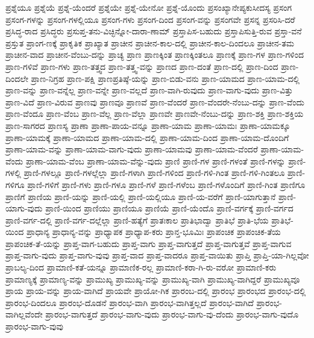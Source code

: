 {ಪ್ರಶ್ನೆಯೂ
ಪ್ರಶ್ನೆಯೆ
ಪ್ರಶ್ನೆ-ಯೆಂದರೆ
ಪ್ರಶ್ನೆಯೇ
ಪ್ರಶ್ನೆ-ಯೇನೋ
ಪ್ರಶ್ನೆ-ಯೊಂದು
ಪ್ರಸಂಖ್ಯಾನೇಪ್ಯಕುಸೀದಸ್ಯ
ಪ್ರಸಂಗ
ಪ್ರಸಂಗ-ಗಳನ್ನು
ಪ್ರಸಂಗ-ಗಳಲ್ಲಿಯೂ
ಪ್ರಸಂಗ-ಗಳು
ಪ್ರಸಂಗ-ದಿಂದ
ಪ್ರಸಂಗ-ವನ್ನು
ಪ್ರಸಂಗವೇ
ಪ್ರಸನ್ನ
ಪ್ರಸರಿಸಿ-ದರೆ
ಪ್ರಸಿದ್ಧ-ರಾದ
ಪ್ರಸಿದ್ಧರು
ಪ್ರಸುಪ್ತ-ತನು-ವಿಚ್ಛಿನ್ನೋ-ದಾರಾ-ಣಾಮ್
ಪ್ರಸ್ತಾಪಿಸ-ಬಹುದು
ಪ್ರಸ್ತಾಪಿಸುತ್ತಿ-ರುವ
ಪ್ರಸ್ತಾ-ವನೆ
ಪ್ರಸ್ತುತ
ಪ್ರಾಂಗ-ಣಕ್ಕೆ
ಪ್ರಾಕೃತಿಕ
ಪ್ರಾಖ್ಯಾತ
ಪ್ರಾಚೀನ
ಪ್ರಾಚೀನ-ಕಾಲ-ದಲ್ಲಿ
ಪ್ರಾಚೀನ-ಕಾಲ-ದಿಂದಲೂ
ಪ್ರಾಚೀನ-ತಮ
ಪ್ರಾಚೀನ-ವಾದ
ಪ್ರಾಚೀನ-ವೆಂಬು-ದನ್ನು
ಪ್ರಾಚ್ಯ
ಪ್ರಾಣ
ಪ್ರಾಣಕ್ಕಿಂತ
ಪ್ರಾಣಕ್ಕಿಂತಲೂ
ಪ್ರಾಣಕ್ಕೆ
ಪ್ರಾಣ-ಗಳ
ಪ್ರಾಣ-ಗಳಿಂದ
ಪ್ರಾಣ-ಗಳಿವೆ
ಪ್ರಾಣ-ಗಳು
ಪ್ರಾಣ-ತತ್ತ್ವದ
ಪ್ರಾಣ-ತತ್ತ್ವ-ವನ್ನು
ಪ್ರಾಣದ
ಪ್ರಾಣ-ದಂತೆ
ಪ್ರಾಣ-ದಲ್ಲಿ
ಪ್ರಾಣ-ದಿಂದ
ಪ್ರಾಣ-ದಿಂದಲೇ
ಪ್ರಾಣ-ನಿಗ್ರಹ
ಪ್ರಾಣ-ಪಕ್ಷಿ
ಪ್ರಾಣಪ್ರತಿಷ್ಠೆ-ಯನ್ನು
ಪ್ರಾಣ-ಬಿಡು-ವನು
ಪ್ರಾಣ-ಯಾಮದ
ಪ್ರಾಣ-ಯಾಮ-ದಲ್ಲಿ
ಪ್ರಾಣ-ವನ್ನು
ಪ್ರಾಣ-ವನ್ನೆಲ್ಲ
ಪ್ರಾಣ-ವನ್ನೇ
ಪ್ರಾಣ-ವಲ್ಲದೆ
ಪ್ರಾಣ-ವಾಗಿ-ರುವುದು
ಪ್ರಾಣ-ವಾಗು-ವುದು
ಪ್ರಾಣ-ವಿತ್ತು
ಪ್ರಾಣ-ವಿದೆ
ಪ್ರಾಣ-ವಿರುವ
ಪ್ರಾಣವು
ಪ್ರಾಣವೂ
ಪ್ರಾಣವೆ
ಪ್ರಾಣ-ವೆಂದರೆ
ಪ್ರಾಣ-ವೆಂದರೇ-ನೆಂಬು-ದನ್ನು
ಪ್ರಾಣ-ವೆಂದು
ಪ್ರಾಣ-ವೆಂದೂ
ಪ್ರಾಣ-ವೆಂಬ
ಪ್ರಾಣ-ವೆಲ್ಲ
ಪ್ರಾಣ-ವೆಲ್ಲಾ
ಪ್ರಾಣವೇ
ಪ್ರಾಣವೇ-ನೆಂಬು-ದನ್ನು
ಪ್ರಾಣ-ಶಕ್ತಿ
ಪ್ರಾಣ-ಶಕ್ತಿಯ
ಪ್ರಾಣ-ಸಾಗರದ
ಪ್ರಾಣಸ್ಯ
ಪ್ರಾಣಾ
ಪ್ರಾಣಾ-ಪಾಯ-ವನ್ನೂ
ಪ್ರಾಣಾ-ಯಾಮ
ಪ್ರಾಣಾ-ಯಾಮಃ
ಪ್ರಾಣಾ-ಯಾಮಕ್ಕೂ
ಪ್ರಾಣಾ-ಯಾಮಕ್ಕೆ
ಪ್ರಾಣಾ-ಯಾಮದ
ಪ್ರಾಣಾ-ಯಾಮ-ದಲ್ಲಿ
ಪ್ರಾಣಾ-ಯಾಮ-ದಿಂದ
ಪ್ರಾಣಾ-ಯಾಮ-ದೊಂದಿಗೆ
ಪ್ರಾಣಾ-ಯಾಮ-ವನ್ನು
ಪ್ರಾಣಾ-ಯಾಮ-ವಾಗು-ವುದು
ಪ್ರಾಣಾ-ಯಾಮವು
ಪ್ರಾಣಾ-ಯಾಮ-ವೆಂದರೆ
ಪ್ರಾಣಾ-ಯಾಮ-ವೆಂದು
ಪ್ರಾಣಾ-ಯಾಮ-ವೆಂಬ
ಪ್ರಾಣಾ-ಯಾಮ-ವೆನ್ನು-ವುದು
ಪ್ರಾಣಿ
ಪ್ರಾಣಿ-ಗಳ
ಪ್ರಾಣಿ-ಗಳಂತೆ
ಪ್ರಾಣಿ-ಗಳನ್ನು
ಪ್ರಾಣಿ-ಗಳಲ್ಲಿ
ಪ್ರಾಣಿ-ಗಳಲ್ಲೂ
ಪ್ರಾಣಿ-ಗಳಲ್ಲೆಲ್ಲಾ
ಪ್ರಾಣಿ-ಗಳಾಗಿ
ಪ್ರಾಣಿ-ಗಳಿಂದ
ಪ್ರಾಣಿ-ಗಳಿ-ಗಿಂತ
ಪ್ರಾಣಿ-ಗಳಿ-ಗಿಂತಲೂ
ಪ್ರಾಣಿ-ಗಳಿಗೂ
ಪ್ರಾಣಿ-ಗಳಿಗೆ
ಪ್ರಾಣಿ-ಗಳು
ಪ್ರಾಣಿ-ಗಳೂ
ಪ್ರಾಣಿ-ಗಳೆ
ಪ್ರಾಣಿ-ಗಳೆಂಬ
ಪ್ರಾಣಿ-ಗಳೊಂದಿಗೆ
ಪ್ರಾಣಿ-ಗಿಂತ
ಪ್ರಾಣಿಗೂ
ಪ್ರಾಣಿಗೆ
ಪ್ರಾಣಿಯ
ಪ್ರಾಣಿ-ಯನ್ನು
ಪ್ರಾಣಿ-ಯಲ್ಲಿ
ಪ್ರಾಣಿ-ಯಲ್ಲಿಯೂ
ಪ್ರಾಣಿ-ಯ-ವರೆಗೆ
ಪ್ರಾಣಿ-ಯಾಗುತ್ತಾನೆ
ಪ್ರಾಣಿ-ಯಾಗು-ವುದು
ಪ್ರಾಣಿ-ಯಿಂದ
ಪ್ರಾಣಿಯು
ಪ್ರಾಣಿಯೂ
ಪ್ರಾಣಿಯೆ
ಪ್ರಾಣಿ-ಯೆಂದೊ
ಪ್ರಾಣಿ-ವರ್ಗಕ್ಕೆ
ಪ್ರಾಣಿ-ವರ್ಗದ
ಪ್ರಾಣಿ-ವರ್ಗ-ದಲ್ಲಿ
ಪ್ರಾಣಿ-ವರ್ಗ-ದಲ್ಲೆಲ್ಲಾ
ಪ್ರಾಣಿ-ಹತ್ಯೆಗೆ
ಪ್ರಾತಃಕಾಲ
ಪ್ರಾತಿಭಾದ್ವಾ
ಪ್ರಾತಿಭೆ
ಪ್ರಾತಿ-ಭೆಯ
ಪ್ರಾತಿಭೆ-ಯಿಂದ
ಪ್ರಾಧಾನ್ಯ
ಪ್ರಾಧಾನ್ಯ-ವನ್ನು
ಪ್ರಾಧ್ಯಾಪಕ
ಪ್ರಾಧ್ಯಾಪ-ಕರು
ಪ್ರಾನ್ತ-ಭೂಮಿಃ
ಪ್ರಾಪಂಚಿಕ
ಪ್ರಾಪಂಚಿಕ-ತೆಯ
ಪ್ರಾಪಂಚಿಕ-ತೆ-ಯನ್ನು
ಪ್ರಾಪ್ತ-ವಾಗ-ಬಹುದು
ಪ್ರಾಪ್ತ-ವಾಗು
ಪ್ರಾಪ್ತ-ವಾಗುತ್ತದೆ
ಪ್ರಾಪ್ತ-ವಾಗುತ್ತವೆ
ಪ್ರಾಪ್ತ-ವಾಗುವ
ಪ್ರಾಪ್ತ-ವಾಗು-ವುದು
ಪ್ರಾಪ್ತ-ವಾಗು-ವುವು
ಪ್ರಾಪ್ತ-ವಾದ
ಪ್ರಾಪ್ತ-ವಾದರೂ
ಪ್ರಾಪ್ತ-ವಾಯಿತು
ಪ್ರಾಪ್ತಿ
ಪ್ರಾಪ್ತಿ-ಯಾ-ಗಿಲ್ಲವೋ
ಪ್ರಾಬಲ್ಯ-ದಿಂದ
ಪ್ರಾಮಾಣಿ-ಕತೆ-ಯನ್ನೂ
ಪ್ರಾಮಾಣಿಕ-ರಲ್ಲ
ಪ್ರಾಮಾಣಿ-ಕರಾ-ಗಿ-ರು-ವರೋ
ಪ್ರಾಮಾಣಿ-ಕರು
ಪ್ರಾಮಾಣ್ಯಕ್ಕೆ
ಪ್ರಾಮಾಣ್ಯ-ವನ್ನು
ಪ್ರಾಮುಖ್ಯ
ಪ್ರಾಮುಖ್ಯ-ವನ್ನು
ಪ್ರಾಮುಖ್ಯ-ವಾಗಿ
ಪ್ರಾಮುಖ್ಯ-ವಾಗಿದ್ದರೆ
ಪ್ರಾಮುಖ್ಯವೂ
ಪ್ರಾಯ
ಪ್ರಾಯ-ವನ್ನು
ಪ್ರಾಯ-ವಾಗಿದೆ
ಪ್ರಾಯವೇ
ಪ್ರಾಯೋ-ಗಿಕ
ಪ್ರಾರಂಬ-ದಲ್ಲಿ
ಪ್ರಾರಂಭ
ಪ್ರಾರಂಭದ
ಪ್ರಾರಂಭ-ದಲ್ಲಿ
ಪ್ರಾರಂಭ-ದಿಂದಲೂ
ಪ್ರಾರಂಭ-ದೊಡನೆ
ಪ್ರಾರಂಭ-ವಾಗಿ
ಪ್ರಾರಂಭ-ವಾಗಿತ್ತಲ್ಲದೆ
ಪ್ರಾರಂಭ-ವಾಗಿದೆ
ಪ್ರಾರಂಭ-ವಾಗಿಲ್ಲವೆಂದೇ
ಪ್ರಾರಂಭ-ವಾಗುತ್ತದೆ
ಪ್ರಾರಂಭ-ವಾಗು-ವುದು
ಪ್ರಾರಂಭ-ವಾಗು-ವು-ದೆಂದು
ಪ್ರಾರಂಭ-ವಾಗು-ವುದೊ
ಪ್ರಾರಂಭ-ವಾಗು-ವುವು
}
